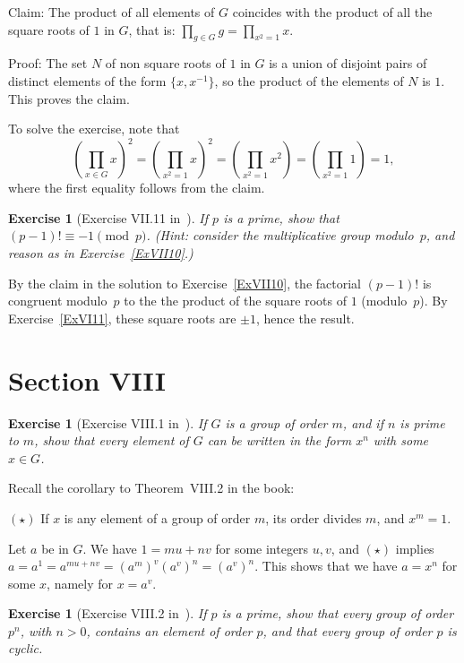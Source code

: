 \documentclass[12pt,letterpaper]{article}
\newtheorem{exer}[thm]{Exercise}
\theoremstyle{definition}
\begin{document}
Claim: The product of all elements of $G$ coincides with the product of all the square roots of $1$ in $G$, that is: $\prod_{g\in G}g=\prod_{x^2=1}x$. 

Proof: The set $N$ of non square roots of $1$ in $G$ is a union of disjoint pairs of distinct elements of the form $\{x,x^{-1}\}$, so the product of the elements of $N$ is $1$. This proves the claim. 

To solve the exercise, note that 
$$
\left(\prod_{x\in G}x\right)^2=\left(\prod_{x^2=1}x\right)^2=\left(\prod_{x^2=1}x^2\right)=\left(\prod_{x^2=1}1\right)=1,
$$ 
where the first equality follows from the claim. 

\begin{exer}[Exercise VII.11 in~\cite{weil1979}]
If $p$ is a prime, show that $(p-1)!\equiv -1\pmod p$. (Hint: consider the multiplicative group modulo~$p$, and reason as in Exercise~\ref{ExVII10}.)
\end{exer}

By the claim in the solution to Exercise~\ref{ExVII10}, the factorial $(p-1)!$ is congruent modulo~$p$ to the the product of the square roots of $1$ (modulo~$p$). By Exercise~\ref{ExVI11}, these square roots are $\pm1$, hence the result. 

\section{Section VIII} %

\begin{exer}[Exercise VIII.1 in~\cite{weil1979}]\label{ExVIII1}
If $G$ is a group of order $m$, and if $n$ is prime to $m$, show that every element of $G$ can be written in the form $x^n$ with some $x\in G$.
\end{exer}

Recall the corollary to Theorem~VIII.2 in the book: 

\noindent $(\star)$ If $x$ is any element of a group of order $m$, its order divides $m$, and $x^m=1$. 

Let $a$ be in $G$. We have $1=mu+nv$ for some integers $u,v$, and $(\star)$ implies $a=a^1=a^{mu+nv}=(a^m)^v(a^v)^n=(a^v)^n$. This shows that we have $a=x^n$ for some $x$, namely for $x=a^v$. 

\begin{exer}[Exercise VIII.2 in~\cite{weil1979}]
If $p$ is a prime, show that every group of order $p^n$, with $n>0$, contains an element of order $p$, and that every group of order $p$ is cyclic.
\end{exer}
\end{document}
